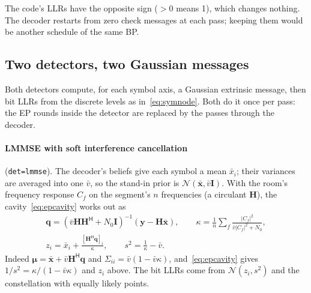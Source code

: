 \documentclass[11pt,a4paper]{article}
\newcommand{\code}[1]{\texttt{#1}}
\newcommand{\N}{\mathcal{N}}
\theoremstyle{definition}
\theoremstyle{remark}
\begin{document}
The code's LLRs have the opposite sign ($>0$ means 1), which changes nothing. The decoder restarts from zero check messages at each pass; keeping them would be another schedule of the same BP.

\subsection{Two detectors, two Gaussian messages}
\label{sec:smap}

Both detectors compute, for each symbol axis, a Gaussian extrinsic message, then bit LLRs from the discrete levels as in~\eqref{eq:symnode}. Both do it once per pass: the EP rounds inside the detector are replaced by the passes through the decoder.

\paragraph{LMMSE with soft interference cancellation} (\code{det=lmmse}). The decoder's beliefs give each symbol a mean $\bar x_i$; their variances are averaged into one $\bar v$, so the stand-in prior is $\N(\bar{\bm{x}},\bar v\bm{I})$. With the room's frequency response $C_f$ on the segment's $n$ frequencies (a circulant $\bm{H}$), the cavity~\eqref{eq:epcavity} works out as
\begin{gather}
  \bm{q} = \left(\bar v\bm{H}\bm{H}^{\mathsf H}+N_0\bm{I}\right)^{-1}(\bm{y}-\bm{H}\bar{\bm{x}}),\qquad
  \kappa = \frac{1}{n}\sum_f \frac{|C_f|^2}{\bar v|C_f|^2+N_0},\\
  z_i = \bar x_i + \frac{[\bm{H}^{\mathsf H}\bm{q}]_i}{\kappa},\qquad s^2 = \frac{1}{\kappa}-\bar v.
\end{gather}
Indeed $\bm{\mu} = \bar{\bm{x}}+\bar v\bm{H}^{\mathsf H}\bm{q}$ and $\Sigma_{ii} = \bar v(1-\bar v\kappa)$, and~\eqref{eq:epcavity} gives $1/s^2 = \kappa/(1-\bar v\kappa)$ and $z_i$ above. The bit LLRs come from $\N(z_i,s^2)$ and the constellation with equally likely points.
\end{document}
